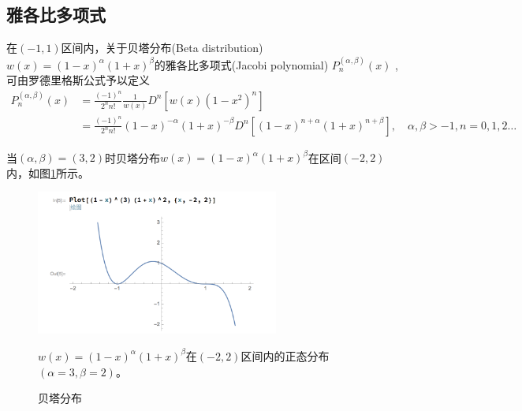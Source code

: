 \begin{subappendices}
\subsection{雅各比多项式}
\label{sec:poly-jacobi-polynomial}
\begin{theorem}[雅各比多项式的罗德里格斯公式]
在$(-1,1)$区间内，关于贝塔分布(Beta distribution) $w(x)=(1-x)^{\alpha} (1+x)^{\beta}$的雅各比多项式(Jacobi polynomial) $P_n^{(\alpha,\beta)}(x)$ ,可由罗德里格斯公式予以定义
\begin{equation}
  \label{eq:poly-jacobi-polynomial-def}
  \begin{split}
    P_n^{(\alpha,\beta)} (x) &= \frac{(-1)^n}{2^n n!} \frac{1}{w(x)} D^n \left[ w(x) (1-x^2)^n \right] \\
    &= \frac{(-1)^n}{2^n n!} (1-x)^{-\alpha} (1+x)^{-\beta} D^n \left[ (1-x)^{n+\alpha} (1+x)^{n+\beta} \right], \quad \alpha, \beta > -1, n=0,1,2\ldots
  \end{split}
\end{equation}
\end{theorem}

当$(\alpha,\beta)=(3,2)$时贝塔分布$w(x)=(1-x)^{\alpha} (1+x)^{\beta}$在区间$(-2,2)$内，如图\ref{fig:poly-beta-distribution-example}所示。

\begin{figure}[htbp]
   \caption{贝塔分布}
  \centering
  \includegraphics[width=8cm]{./Figures/20170906-beta-distri}
  \label{fig:poly-beta-distribution-example}
%

\small{$w(x)=(1-x)^{\alpha} (1+x)^{\beta}$在$(-2,2)$区间内的正态分布$(\alpha = 3, \beta = 2)$。}
\end{figure}


\end{subappendices}
